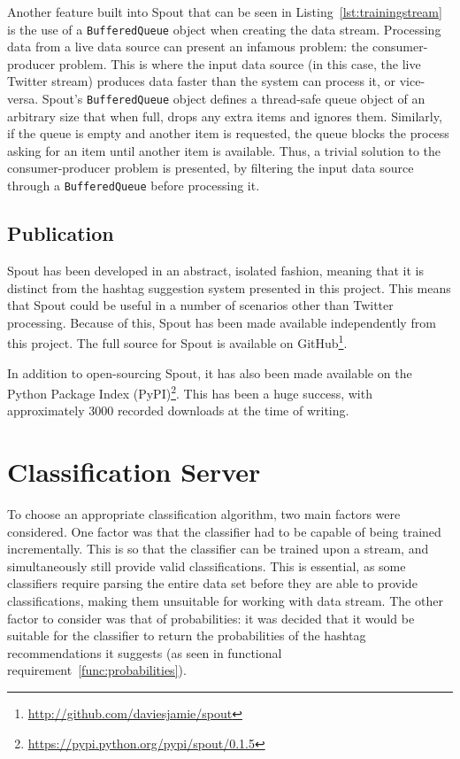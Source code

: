 \documentclass[11pt,a4paper]{report}
\begin{document}
Another feature built into Spout that can be seen in Listing~\ref{lst:trainingstream} is the use of a \verb+BufferedQueue+ object when creating the data stream. Processing data from a live data source can present an infamous problem: the consumer-producer problem. This is where the input data source (in this case, the live Twitter stream) produces data faster than the system can process it, or vice-versa. Spout's \verb+BufferedQueue+ object defines a thread-safe queue object of an arbitrary size that when full, drops any extra items and ignores them. Similarly, if the queue is empty and another item is requested, the queue blocks the process asking for an item until another item is available. Thus, a trivial solution to the consumer-producer problem is presented, by filtering the input data source through a \verb+BufferedQueue+ before processing it.

\subsection{Publication}

Spout has been developed in an abstract, isolated fashion, meaning that it is distinct from the hashtag suggestion system presented in this project. This means that Spout could be useful in a number of scenarios other than Twitter processing. Because of this, Spout has been made available independently from this project. The full source for Spout is available on GitHub\footnote{\url{http://github.com/daviesjamie/spout}}.

In addition to open-sourcing Spout, it has also been made available on the Python Package Index (PyPI)\footnote{\url{https://pypi.python.org/pypi/spout/0.1.5}}. This has been a huge success, with approximately 3000 recorded downloads at the time of writing.

\section{Classification Server}
To choose an appropriate classification algorithm, two main factors were considered. One factor was that the classifier had to be capable of being trained incrementally. This is so that the classifier can be trained upon a stream, and simultaneously still provide valid classifications. This is essential, as some classifiers require parsing the entire data set before they are able to provide classifications, making them unsuitable for working with data stream. The other factor to consider was that of probabilities: it was decided that it would be suitable for the classifier to return the probabilities of the hashtag recommendations it suggests (as seen in functional requirement~\ref{func:probabilities}).
\end{document}
